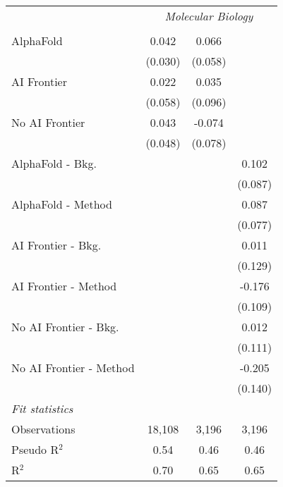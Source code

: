 \begin{tabular}{lccc}
 & \multicolumn{3}{c}{\textit{Molecular Biology}} \\ \\
   AlphaFold               & 0.042   & 0.066   &   \\   
                           & (0.030) & (0.058) &   \\   
   AI Frontier             & 0.022   & 0.035   &   \\   
                           & (0.058) & (0.096) &   \\   
   No AI Frontier          & 0.043   & -0.074  &   \\   
                           & (0.048) & (0.078) &   \\   
   AlphaFold - Bkg.        &         &         & 0.102\\   
                           &         &         & (0.087)\\   
   AlphaFold - Method      &         &         & 0.087\\   
                           &         &         & (0.077)\\   
   AI Frontier - Bkg.      &         &         & 0.011\\   
                           &         &         & (0.129)\\   
   AI Frontier - Method    &         &         & -0.176\\   
                           &         &         & (0.109)\\   
   No AI Frontier - Bkg.   &         &         & 0.012\\   
                           &         &         & (0.111)\\   
   No AI Frontier - Method &         &         & -0.205\\   
                           &         &         & (0.140)\\   
   \midrule
   \emph{Fit statistics}\\
   Observations            & 18,108  & 3,196   & 3,196\\  
   Pseudo R$^2$            & 0.54    & 0.46    & 0.46\\  
   R$^2$                   & 0.70    & 0.65    & 0.65\\  
   

\end{tabular}
